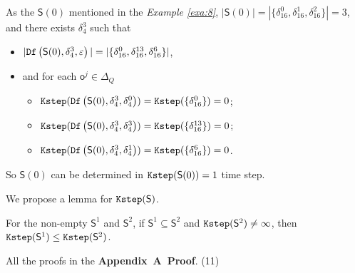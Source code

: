 \begin{example}\label{exa:9}
As the $\mathsf{S}(0)$ mentioned in the {\em Example \ref{exa:8}}, $|\mathsf{S}(0)|=|\{\delta_{16}^0,\delta_{16}^1,\delta_{16}^2\}|=3$, and there exists $\delta_{4}^3$ such that 
 \begin{itemize}
 \item  $|{\tt Df}\left(\mathsf{S}(0),\delta_{4}^3,\varepsilon\right)|=|\{\delta_{16}^0,\delta_{16}^{13},\delta_{16}^6\}|$,
 \item   and for each $\mathsf{o}^{j}\in \Delta_Q$
  \begin{itemize}
  \item   ${\tt Kstep}({\tt Df}\left(\mathsf{S}(0),\delta_{4}^3,\delta_{4}^0\right))={\tt Kstep}(\{\delta_{16}^0\})=0$;
 \item  ${\tt Kstep}({\tt Df}\left(\mathsf{S}(0),\delta_{4}^3,\delta_{4}^3\right))={\tt Kstep}(\{\delta_{16}^{13}\})=0$;
  \item  ${\tt Kstep}({\tt Df}\left(\mathsf{S}(0),\delta_{4}^3,\delta_{4}^1\right))={\tt Kstep}(\{\delta_{16}^{6}\})=0$.
 \end{itemize}
 \end{itemize}
 So $\mathsf{S}(0)$ can be determined in ${\tt Kstep}(\mathsf{S}(0))=1$ time step.
\end{example}  

We propose a lemma for ${\tt Kstep}(\mathsf{S})$.

\begin{lemma}
For the non-empty $\mathsf{S}^{1}$ and $\mathsf{S}^{2}$, if $\mathsf{S}^{1}\subseteq\mathsf{S}^{2}$ and ${\tt Kstep}(\mathsf{S}^{2})\ne\infty$, then ${\tt Kstep}(\mathsf{S}^{1})\le{\tt Kstep}(\mathsf{S}^{2})$.%
  \label{lemm:1}
\end{lemma}

All the proofs in the {\bf Appendix~A~Proof}. {\color{red} (11)}

